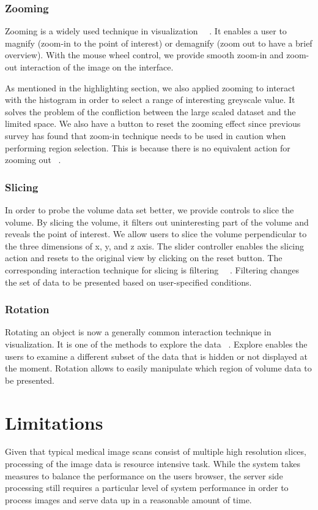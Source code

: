 \documentclass[annual]{acmsiggraph}
\begin{document}
\subsubsection{Zooming}
Zooming is a widely used technique in visualization ~\cite{shneiderman:1996}~\cite{cockburn:2008}. It enables a user to magnify (zoom-in to the point of interest) or demagnify (zoom out to have a brief overview). With the mouse wheel control, we provide smooth zoom-in and zoom-out interaction of the image on the interface. 

As mentioned in the highlighting section, we also applied zooming to interact with the histogram in order to select a range of interesting greyscale value. It solves the problem of the confliction between the large scaled dataset and the limited space. We also have a button to reset the zooming effect since previous survey has found that zoom-in technique needs to be used in caution when performing region selection. This is because there is no equivalent action for zooming out ~\cite{cockburn:2008}.

\subsubsection{Slicing}
In order to probe the volume data set better, we provide controls to slice the volume. By slicing the volume, it filters out uninteresting part of the volume and reveals the point of interest. We allow users to slice the volume perpendicular to the three dimensions of x, y, and z axis. The slider controller enables the slicing action and resets to the original view by clicking on the reset button. The corresponding interaction technique for slicing is filtering ~\cite{shneiderman:1996}~\cite{yi:2007}. Filtering changes the set of data to be presented based on user-specified conditions. 

\subsubsection{Rotation}
Rotating an object is now a generally common interaction technique in visualization. It is one of the methods to explore the data ~\cite{yi:2007}. Explore enables the users to examine a different subset of the data that is hidden or not displayed at the moment. Rotation allows to easily manipulate which region of volume data to be presented.

\section{Limitations}
Given that typical medical image scans consist of multiple high resolution slices, processing of the image data is resource intensive task.  While the system takes measures to balance the performance on the users browser, the server side processing still requires a particular level of system performance in order to process images and serve data up in a reasonable amount of time.
\end{document}
